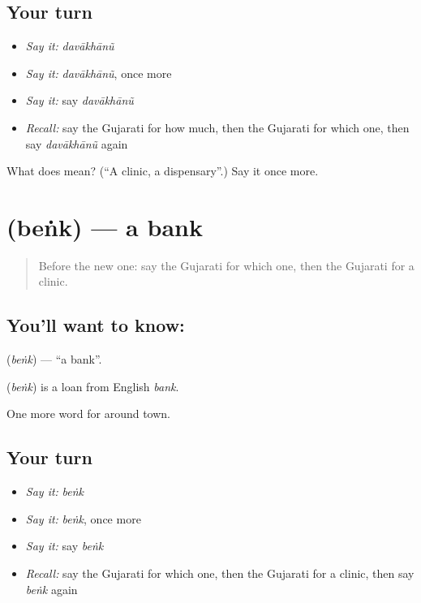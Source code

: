 \subsection*{Your turn}
\begin{itemize}
\raggedright
  \item \emph{Say it:} \emph{davākhānũ}
  \item \emph{Say it:} \emph{davākhānũ}, once more
  \item \emph{Say it:} say \emph{davākhānũ}
  \item \emph{Recall:} say the Gujarati for how much, then the Gujarati for which one, then say \emph{davākhānũ} again
\end{itemize}

\begin{tcolorbox}[breakable,colback=teal!4,colframe=teal!35!black,title={Before you move on}]
What does  mean? (\textquotedblleft{}A clinic, a dispensary\textquotedblright{}.) Say it once more.
\end{tcolorbox}
\section[\texorpdfstring{\gu{બેંક} (beṅk)}{બેંક (beṅk)}]{ (beṅk) — a bank}

\label{lesson:GU-C84-bank}



\begin{quote}
Before the new one: say the Gujarati for which one, then the Gujarati for a clinic.
\end{quote}

\subsection*{You'll want to know: }
\textbf{} (\emph{beṅk}) — \textquotedblleft{}a bank\textquotedblright{}.

\begin{cousinweb}
\textbf{} (\emph{beṅk}) is a loan from English \emph{bank}.
\end{cousinweb}

\begin{grammarlens}[title={What you've built}]
One more word for around town.
\end{grammarlens}

\subsection*{Your turn}
\begin{itemize}
\raggedright
  \item \emph{Say it:} \emph{beṅk}
  \item \emph{Say it:} \emph{beṅk}, once more
  \item \emph{Say it:} say \emph{beṅk}
  \item \emph{Recall:} say the Gujarati for which one, then the Gujarati for a clinic, then say \emph{beṅk} again
\end{itemize}

